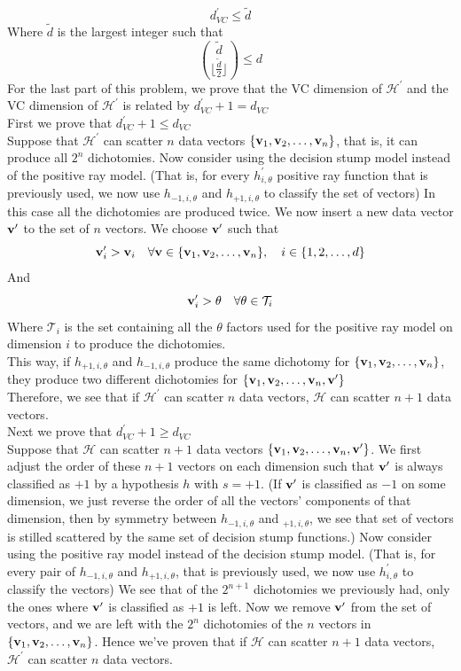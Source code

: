 \documentclass[11pt]{article}
\theoremstyle{definition}
\begin{document}
 \[
   d^\prime_{VC} \leq \tilde{d}
 \]
 Where $\tilde{d}$ is the largest integer such that
 \[
   {\tilde{d}\choose \lfloor\frac{\tilde{d}}{2}\rfloor} \leq d
 \]
 \medbreak
 For the last part of this problem, we prove that the VC dimension of $\mathcal{H}^\prime$ and the VC dimension of $\mathcal{H}^\prime$ is related by $d_{VC}^\prime + 1= d_{VC}$ \\ 
 \medbreak
 First we prove that $d^\prime_{VC} + 1 \leq d_{VC}$ \\ 
 Suppose that $\mathcal{H}^\prime$ can scatter $n$ data vectors $\{\vb{v}_1, \vb{v}_2,\dots,\vb{v}_n\}$, that is, it can produce all $2^n$ dichotomies. Now consider using the decision stump model instead of the positive ray model. (That is, for every $h^\prime_{i, \theta}$ positive ray function that is previously used, we now use $h_{-1, i, \theta}$ and $h_{+1, i, \theta}$ to classify the set of vectors) In this case all the dichotomies are produced twice. We now insert a new data vector $\vb{v}^\prime$ to the set of $n$ vectors. We choose $\vb{v}^\prime$ such that
 \[
   \vb{v}^\prime_i > \vb{v}_i\quad \forall \vb{v}\in \{\vb{v}_1, \vb{v}_2,\dots,\vb{v}_n\}, \quad i \in \{1, 2,\dots,d\}
 \]
 And
 \[
   \vb{v}^\prime_i > \theta \quad \forall \theta \in \mathcal{T}_i
 \]
 Where $\mathcal{T}_i$ is the set containing all the $\theta$ factors used for the positive ray model on dimension $i$ to produce the dichotomies. \\ 
 This way, if $h_{+1, i, \theta}$ and $h_{-1, i, \theta}$ produce the same dichotomy for $\{\vb{v}_1, \vb{v}_2,\dots,\vb{v}_n\}$, they produce two different dichotomies for $\{\vb{v}_1, \vb{v}_2,\dots,\vb{v}_n, \vb{v}^\prime\}$ \\ 
 Therefore, we see that if $\mathcal{H}^\prime$ can scatter $n$ data vectors, $\mathcal{H}$ can scatter $n + 1$ data vectors. \\ 
 \medbreak
 Next we prove that $d^\prime_{VC} + 1 \geq d_{VC}$ \\ 
 Suppose that $\mathcal{H}$ can scatter $n + 1$ data vectors $\{\vb{v}_1, \vb{v}_2,\dots,\vb{v}_n, \vb{v}^\prime\}$. We first adjust the order of these $n + 1$ vectors on each dimension such that $\vb{v}^\prime$ is always classified as $+1$ by a hypothesis $h$ with $s = +1$. (If $\vb{v}^\prime$ is classified as $-1$ on some dimension, we just reverse the order of all the vectors' components of that dimension, then by symmetry between $h_{-1, i, \theta}$ and $_{+1, i, \theta}$, we see that set of vectors is stilled scattered by the same set of decision stump functions.) Now consider using the positive ray model instead of the decision stump model. (That is, for every pair of $h_{-1, i, \theta}$ and $h_{+1, i, \theta}$, that is previously used, we now use $h^\prime_{i, \theta}$ to classify the vectors) We see that of the $2^{n + 1}$ dichotomies we previously had, only the ones where $\vb{v}^\prime$ is classified as $+1$ is left. Now we remove $\vb{v}^\prime$ from the set of vectors, and we are left with the $2^n$ dichotomies of the $n$ vectors in $\{\vb{v}_1, \vb{v}_2,\dots,\vb{v}_n\}$. Hence we've proven that if $\mathcal{H}$ can scatter $n + 1$ data vectors, $\mathcal{H}^\prime$ can scatter $n$ data vectors. \\ 
\end{document}
